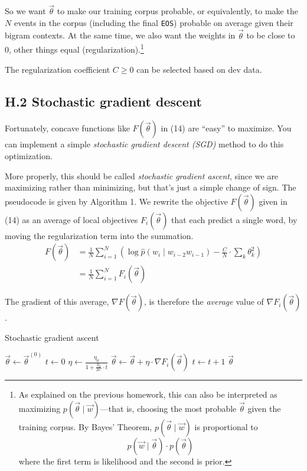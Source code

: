 So we want $\vec{\theta}$ to make our training corpus probable, or equivalently, to make the $N$ events in the corpus (including the final \texttt{EOS}) probable on average given their bigram contexts. At the same time, we also want the weights in $\vec{\theta}$ to be close to 0, other things equal (regularization).\footnote{As explained on the previous homework, this can also be interpreted as maximizing $p(\vec{\theta} \mid \vec{w})$---that is, choosing the most probable $\vec{\theta}$ given the training corpus. By Bayes’ Theorem, $p(\vec{\theta} \mid \vec{w})$ is proportional to 
\[
p(\vec{w} \mid \vec{\theta}) \cdot p(\vec{\theta})
\]
where the first term is likelihood and the second is prior.}  

The regularization coefficient $C \geq 0$ can be selected based on dev data.

\subsection*{H.2 Stochastic gradient descent}

Fortunately, concave functions like $F(\vec{\theta})$ in (14) are “easy” to maximize. You can implement a simple \textit{stochastic gradient descent (SGD)} method to do this optimization.  

More properly, this should be called \textit{stochastic gradient ascent}, since we are maximizing rather than minimizing, but that’s just a simple change of sign. The pseudocode is given by Algorithm 1. We rewrite the objective $F(\vec{\theta})$ given in (14) as an average of local objectives $F_i(\vec{\theta})$ that each predict a single word, by moving the regularization term into the summation.
\begin{align}
F(\vec{\theta}) &= \frac{1}{N} \sum_{i=1}^N \left( \log \hat{p}(w_i \mid w_{i-2} w_{i-1}) - \frac{C}{N}\cdot \sum_k \theta_k^2 \right) \\
&= \frac{1}{N} \sum_{i=1}^N F_i(\vec{\theta})
\end{align}

The gradient of this average, $\nabla F(\vec{\theta})$, is therefore the \emph{average} value of $\nabla F_i(\vec{\theta})$.

\begin{algorithm}[H]
\caption{Stochastic gradient ascent}
\begin{algorithmic}[1]
\State $\vec{\theta} \gets \vec{\theta}^{(0)}$
\State $t \gets 0$ 
 
     
        \State $\eta \gets \frac{\eta_0}{1 + \frac{\eta_0}{2C} \cdot t}$ 
        \State $\vec{\theta} \gets \vec{\theta} + \eta \cdot \nabla F_i(\vec{\theta})$ 
        \State $t \gets t+1$
    \EndFor
\EndFor
\State \Return $\vec{\theta}$
\EndProcedure
\end{algorithmic}
\end{algorithm}

